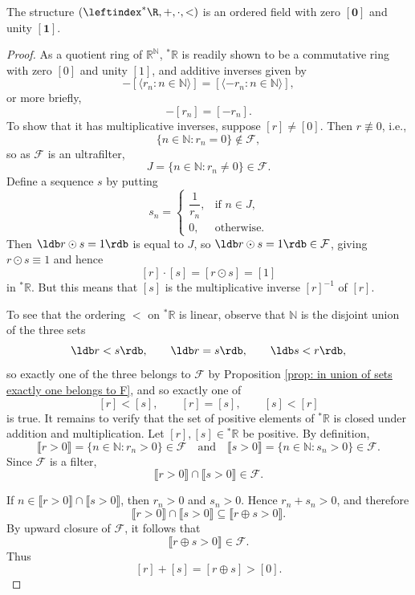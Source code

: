 \begin{thm} 
    The structure $(\leftindex^* {\R}, +, \cdot, <)$ is an ordered field with zero $[\mathbf{0}]$ and unity $[\mathbf{1}]$. 
\end{thm}
\begin{proof}
As a quotient ring of $\mathbb{R}^{\mathbb{N}}$, ${}^{*}\mathbb{R}$ is readily shown to be a commutative ring with zero $[0]$ and unity $[1]$, and additive inverses given by
\[
-[\langle r_n : n \in \mathbb{N}\rangle] 
=
 [\langle-r_n : n \in \mathbb{N}\rangle],
\]
or more briefly,
\[
-[r_n]=[-r_n].
\]
To show that it has multiplicative inverses, suppose $[r]\neq[0]$. Then $r\not\equiv 0$, i.e.,
\[
\{n\in\mathbb{N}:r_n=0\}\notin\mathcal{F},
\]
so as $\mathcal{F}$ is an ultrafilter,
\[
J=\{n\in\mathbb{N}:r_n\neq 0\}\in\mathcal{F}.
\]
Define a sequence $s$ by putting
\[
s_n=
\begin{cases}
\dfrac{1}{r_n}, & \text{if } n\in J,\\[4pt]
0, & \text{otherwise}.
\end{cases}
\]
Then $\ldb r\odot s=1 \rdb$ is equal to $J$, so $\ldb r\odot s=1 \rdb \in\mathcal{F}$, giving $r\odot s\equiv 1$ and hence
\[
[r]\cdot[s]=[r\odot s]=[1]
\]
in ${}^{*}\mathbb{R}$. But this means that $[s]$ is the multiplicative inverse $[r]^{-1}$ of $[r]$.

To see that the ordering $<$ on ${}^{*}\mathbb{R}$ is linear, observe that $\mathbb{N}$ is the disjoint union of the three sets
\[
\ldb r<s \rdb,\qquad \ldb r=s\rdb,\qquad \ldb s<r \rdb,
\]
so exactly one of the three belongs to $\mathcal{F}$ by Proposition \ref{prop: in union of sets exactly one belongs to F}, and so exactly one of
\[
[r]<[s],\qquad [r]=[s],\qquad [s]<[r]
\]
is true. It remains to verify that the set of positive elements of ${}^*\mathbb{R}$
is closed under addition and multiplication. Let $[r],[s]\in{}^*\mathbb{R}$
be positive. By definition,
\[
\llbracket r>0\rrbracket
=\{n\in\mathbb{N}:r_n>0\}\in\mathcal{F}
\quad\text{and}\quad
\llbracket s>0\rrbracket
=\{n\in\mathbb{N}:s_n>0\}\in\mathcal{F}.
\]
Since $\mathcal{F}$ is a filter,
\[
\llbracket r>0\rrbracket\cap\llbracket s>0\rrbracket\in\mathcal{F}.
\]

If $n\in\llbracket r>0\rrbracket\cap\llbracket s>0\rrbracket$,
then $r_n>0$ and $s_n>0$. Hence $r_n+s_n>0$, and therefore
\[
\llbracket r>0\rrbracket\cap\llbracket s>0\rrbracket
\subseteq
\llbracket r\oplus s>0\rrbracket.
\]
By upward closure of $\mathcal{F}$, it follows that
\[
\llbracket r\oplus s>0\rrbracket\in\mathcal{F}.
\]
Thus
\[
[r]+[s]=[r\oplus s]>[0].
\]


\end{proof}
